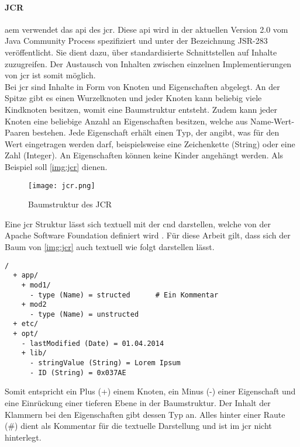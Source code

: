 \paragraph{JCR}
\ac{aem} verwendet das \ac{api} des \ac{jcr}. Diese \ac{api} wird in der aktuellen Version 2.0 vom Java Community Process spezifiziert und unter der Bezeichnung JSR-283 veröffentlicht. Sie dient dazu, über standardisierte Schnittstellen auf Inhalte zuzugreifen. Der Austausch von Inhalten zwischen einzelnen Implementierungen von \ac{jcr} ist somit möglich. \\
Bei \ac{jcr} sind Inhalte in Form von Knoten und Eigenschaften abgelegt. An der Spitze gibt es einen Wurzelknoten und jeder Knoten kann beliebig viele Kindknoten besitzen, womit eine Baumstruktur entsteht. Zudem kann jeder Knoten eine beliebige Anzahl an Eigenschaften besitzen, welche aus Name-Wert-Paaren bestehen. Jede Eigenschaft erhält einen Typ, der angibt, was für den Wert eingetragen werden darf, beispielsweise eine Zeichenkette (String) oder eine Zahl (Integer). An Eigenschaften können keine Kinder angehängt werden. Als Beispiel soll \autoref{img:jcr} dienen.

\begin{figure}[H]
	\begin{center}
		\texttt{[image: jcr.png]}
		\caption{Baumstruktur des JCR}
		\label{img:jcr}
	\end{center}
\end{figure}

Eine \ac{jcr} Struktur lässt sich textuell mit der \ac{cnd} darstellen, welche von der Apache Software Foundation definiert wird \cite{Foundation2017b}.
Für diese Arbeit gilt, dass sich der Baum von \autoref{img:jcr} auch textuell wie folgt darstellen lässt.

\begin{minipage}{\textwidth}
\begin{lstlisting}[style=jcr, caption=Textuelle Darstellung von JCR, label=lst:jcr]
/
  + app/
    + mod1/
      - type (Name) = structed		# Ein Kommentar
    + mod2
	  - type (Name) = unstructed
  + etc/
  + opt/
    - lastModified (Date) = 01.04.2014
    + lib/
      - stringValue (String) = Lorem Ipsum
      - ID (String) = 0x037AE
\end{lstlisting}
\end{minipage}

Somit entspricht ein Plus (+) einem Knoten, ein Minus (-) einer Eigenschaft und eine Einrückung einer tieferen Ebene in der Baumstruktur. Der Inhalt der Klammern bei den Eigenschaften gibt dessen Typ an. Alles hinter einer Raute (\#) dient als Kommentar für die textuelle Darstellung und ist im \ac{jcr} nicht hinterlegt.